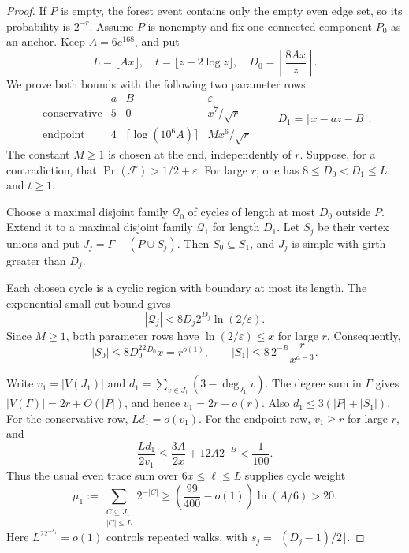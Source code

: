 \begin{proof}
If $P$ is empty, the forest event contains only the empty even edge set, so its probability is $2^{-r}$.
Assume $P$ is nonempty and fix one connected component $P_0$ as an anchor.
Keep $A=6e^{168}$, and put
\[
 L=\lfloor Ax\rfloor,
 \quad t=\lfloor z-2\log z\rfloor,
 \quad D_0=\left\lceil\frac{8Ax}{z}\right\rceil.
\]
We prove both bounds with the following two parameter rows:
\[
\begin{array}{c|c|c|c}
 &a&B&\varepsilon\\ \hline
 \text{conservative}&5&0&x^7/\sqrt r\\
 \text{endpoint}&4&\lceil\log(10^6A)\rceil&Mx^6/\sqrt r
\end{array}
\qquad
 D_1=\lfloor x-az-B\rfloor.
\]
The constant $M\ge1$ is chosen at the end, independently of $r$.
Suppose, for a contradiction, that $\Pr(\mathcal F)>1/2+\varepsilon$.
For large $r$, one has $8\le D_0<D_1\le L$ and $t\ge1$.

Choose a maximal disjoint family $\mathcal Q_0$ of cycles of length at most $D_0$ outside $P$.
Extend it to a maximal disjoint family $\mathcal Q_1$ for length $D_1$.
Let $S_j$ be their vertex unions and put $J_j=\Gamma-(P\cup S_j)$.
Then $S_0\subseteq S_1$, and $J_j$ is simple with girth greater than $D_j$.

Each chosen cycle is a cyclic region with boundary at most its length.
The exponential small-cut bound gives
\[
 |\mathcal Q_j|<8D_j2^{D_j}\ln(2/\varepsilon).
\]
Since $M\ge1$, both parameter rows have $\ln(2/\varepsilon)\le x$ for large $r$.
Consequently,
\begin{equation}\label{eq:endpoint-deletion-sizes}
 |S_0|\le8D_0^22^{D_0}x=r^{o(1)},\qquad
 |S_1|\le8\,2^{-B}\frac r{x^{a-3}}.
\end{equation}

Write $v_1=|V(J_1)|$ and $d_1=\sum_{v\in J_1}(3-\deg_{J_1}v)$.
The degree sum in $\Gamma$ gives $|V(\Gamma)|=2r+O(|P|)$, and hence $v_1=2r+o(r)$.
Also $d_1\le3(|P|+|S_1|)$.
For the conservative row, $Ld_1=o(v_1)$.
For the endpoint row, $v_1\ge r$ for large $r$, and
\[
 \frac{Ld_1}{2v_1}
 \le\frac{3A}{2x}+12A2^{-B}<\frac1{100}.
\]
Thus the usual even trace sum over $6x\le\ell\le L$ supplies cycle weight
\begin{equation}\label{eq:endpoint-initial-mass}
 \mu_1:=\sum_{\substack{C\subseteq J_1\\|C|\le L}}2^{-|C|}
 \ge\left(\frac{99}{400}-o(1)\right)\ln(A/6)>20.
\end{equation}
Here $L^22^{-s_1}=o(1)$ controls repeated walks, with $s_j=\lfloor(D_j-1)/2\rfloor$.


\end{proof}
